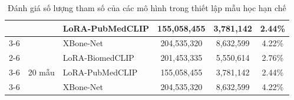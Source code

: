 \begin{table}[htbp]
{\begin{tabular}{|c|l|l|c|c|c|}
 &
   &
  LoRA-PubMedCLIP &
  155,058,455 &
  3,781,142 &
  2.44\% \\ \cline{3-6} 
 &
   &
  \cellcolor{gray!12}XBone-Net &
  \cellcolor{gray!12}204,535,320 &
  \cellcolor{gray!12}8,632,599 &
  \cellcolor{gray!12}4.22\% \\ \cline{2-6} 
 &
  \multirow{3}{*}{20 mẫu} &
  LoRA-BiomedCLIP &
  201,453,335 &
  5,550,614 &
  2.76\% \\ \cline{3-6} 
 &
   &
  LoRA-PubMedCLIP &
  155,058,455 &
  3,781,142 &
  2.44\% \\ \cline{3-6} 
 &
   &
  \cellcolor{gray!12}XBone-Net &
  \cellcolor{gray!12}204,535,320 &
  \cellcolor{gray!12}8,632,599 &
  \cellcolor{gray!12}4.22\% \\ \hline
\end{tabular}%
}
\caption{Đánh giá số lượng tham số của các mô hình trong thiết lập mẫu học hạn chế}
\label{tab:efficiency_few_shot_params}
\end{table}


